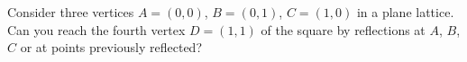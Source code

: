 Consider three vertices $A = (0, 0)$, $B = (0, 1)$, $C = (1, 0)$ in a plane lattice. Can you reach the fourth vertex $D = (1, 1)$ of the square by reflections at $A$, $B$, $C$ or at points previously reflected?
